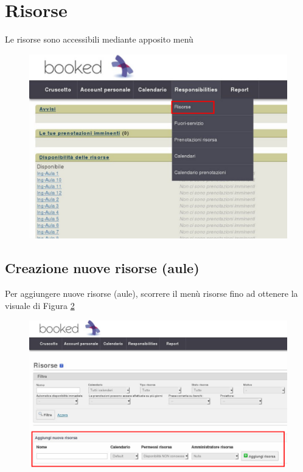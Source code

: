 \section{Risorse}
Le risorse sono accessibili mediante apposito menù
\begin{figure}[H]
\centering{}\includegraphics[scale=0.5]{Immagini/amministratore_menu_generale_selezione_risorse.pdf}
\normalsize
\caption{}
\label{fig:amministratore_menu_generale_selezione_risorse.pdf}
\end{figure}

\subsection{Creazione nuove risorse (aule)}
Per aggiungere nuove risorse (aule), scorrere il menù risorse fino ad ottenere la visuale di
Figura \ref{fig:risorse_vista_generale_creazione.pdf}
\begin{figure}[H]
\centering{}\includegraphics[scale=0.5]{Immagini/risorse_vista_generale_creazione.pdf}
\normalsize
\caption{}
\label{fig:risorse_vista_generale_creazione.pdf}
\end{figure}

